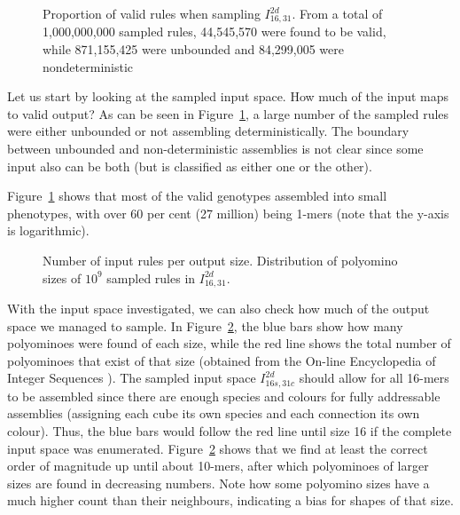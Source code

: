 \begin{figure}[h]
    \centering
    \caption{Proportion of valid rules when sampling \(I_{16,31}^{2d}\). From a total of 1,000,000,000 sampled rules, 44,545,570 were found to be valid, while 871,155,425 were  unbounded and 84,299,005 were nondeterministic}
    \label{fig:ref_validity}
\end{figure}

Let us start by looking at the sampled input space. How much of the input maps to valid output? As can be seen in Figure~\ref{fig:ref_validity}, a large number of the sampled rules were either unbounded or not assembling deterministically. The boundary between unbounded and non-deterministic assemblies is not clear since some input also can be both (but is classified as either one or the other).

Figure~\ref{fig:ref_validity} shows that most of the valid genotypes assembled into small phenotypes, with over 60 per cent (27 million) being 1-mers (note that the y-axis is logarithmic). 

\begin{figure}[h]
    \centering
    \caption{Number of input rules per output size. Distribution of polyomino sizes of \(10^9\) sampled rules in \(I_{16,31}^{2d}\).
    }
    \label{fig:ref_distr}
\end{figure}

With the input space investigated, we can also check how much of the output space we managed to sample. In Figure~\ref{fig:ref_distr}, the blue bars show how many polyominoes were found of each size, while the red line shows the total number of polyominoes that exist of that size (obtained from the On-line Encyclopedia of Integer Sequences \cite{sloane1995encyclopedia, oeisA000988}). The sampled input space \(I_{16s,31c}^{2d}\) should allow for all 16-mers to be assembled since there are enough species and colours for fully addressable assemblies (assigning each cube its own species and each connection its own colour). Thus, the blue bars would follow the red line until size 16 if the complete input space was enumerated. Figure~\ref{fig:ref_distr} shows that we find at least the correct order of magnitude up until about 10-mers, after which polyominoes of larger sizes are found in decreasing numbers. Note how some polyomino sizes have a much higher count than their neighbours, indicating a bias for shapes of that size.

